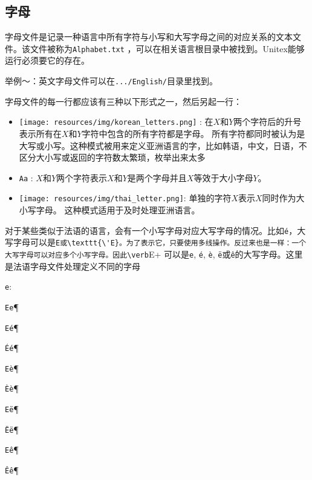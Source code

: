 \subsection{字母}
字母文件是记录一种语言中所有字符与小写和大写字母之间的对应关系的文本文件。该文件被称为\verb+Alphabet.txt+ ，可以在相关语言根目录中被找到。Unitex能够运行必须要它的存在。

\bigskip
\noindent 
举例～：英文字母文件可以在\verb+.../English/+目录里找到。

\bigskip
\noindent 
字母文件的每一行都应该有三种以下形式之一，然后另起一行：

\begin{itemize}
\item \texttt{[image: resources/img/korean\_letters.png]} : 
在$X$和$Y$两个字符后的升号表示所有在$X$和$Y$字符中包含的所有字符都是字母。 所有字符都同时被认为是大写或小写。这种模式被用来定义亚洲语言的字，比如韩语，中文，日语，不区分大小写或返回的字符数太繁琐，枚举出来太多



\item \verb+Aa+ : 
 $X$和$Y$两个字符表示$X$和$Y$是两个字母并且$X$等效于大小字母$Y$。
\item \texttt{[image: resources/img/thai\_letter.png]}: 
 单独的字符$X$表示$X$同时作为大小写字母。 这种模式适用于及时处理亚洲语言。


\end{itemize}

\bigskip
\noindent 
对于某些类似于法语的语言，会有一个小写字母对应大写字母的情况。比如\texttt{é}，大写字母可以是\verb+E或\texttt{\'E}。为了表示它，只要使用多线操作。反过来也是一样：一个大写字母可以对应多个小写字母。因此\verb+E+ 可以是\verb+e+, \texttt{é}, \texttt{è}, \texttt{ë}或\texttt{ê}的大写字母。这里是法语字母文件处理定义不同的字母


\verb+e+:

\bigskip
\noindent
\texttt{Ee}\P

\noindent
\texttt{Eé}\P

\noindent
\texttt{\'Eé}\P

\noindent
\texttt{Eè}\P

\noindent
\texttt{\`Eè}\P


\noindent
\texttt{Eë}\P

\noindent
\texttt{\"Eë}\P

\noindent
\texttt{Eê}\P

\noindent
\texttt{\^Eê}\P

